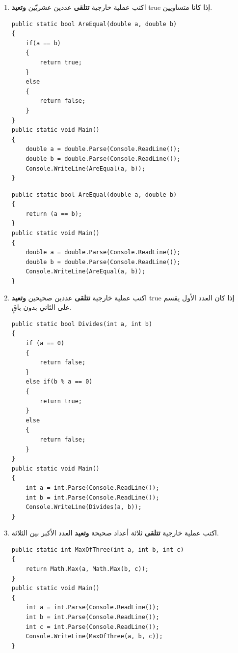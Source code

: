 ﻿\documentclass[12pt]{article}
\begin{document}
\begin{enumerate}[itemsep=3em]
\begin{enumerate}
\item اكتب عملية خارجية \textbf{تتلقى} عددين عشريّين \textbf{وتعيد} \textenglish{true} إذا كانا متساويين.
\ifwithsols
\begin{boxSolution}[1]
\begin{english}
\begin{verbatim}
public static bool AreEqual(double a, double b)
{
    if(a == b)
    {
        return true;
    }
    else
    {
        return false;
    }
}
public static void Main()
{
    double a = double.Parse(Console.ReadLine());
    double b = double.Parse(Console.ReadLine());
    Console.WriteLine(AreEqual(a, b));
}
\end{verbatim}
\end{english}
\end{boxSolution}
\begin{boxSolution}[2]
\begin{english}
\begin{verbatim}
public static bool AreEqual(double a, double b)
{
    return (a == b);
}
public static void Main()
{
    double a = double.Parse(Console.ReadLine());
    double b = double.Parse(Console.ReadLine());
    Console.WriteLine(AreEqual(a, b));
}
\end{verbatim}
\end{english}
\end{boxSolution}
\clearpage
\fi


\item اكتب عملية خارجية \textbf{تتلقى} عددين صحيحين \textbf{وتعيد} \textenglish{true} إذا كان العدد الأول يقسم على الثاني بدون باقٍ.
\ifwithsols
\begin{boxSolution}
\begin{english}
\begin{verbatim}
public static bool Divides(int a, int b)
{
    if (a == 0)
    {
        return false;
    }
    else if(b % a == 0)
    {
        return true;
    }
    else
    {
        return false;
    }
}
public static void Main()
{
    int a = int.Parse(Console.ReadLine());
    int b = int.Parse(Console.ReadLine());
    Console.WriteLine(Divides(a, b));
}
\end{verbatim}
\end{english}
\end{boxSolution}
\clearpage
\fi


\item اكتب عملية خارجية \textbf{تتلقى} ثلاثة أعداد صحيحة \textbf{وتعيد} العدد الأكبر بين الثلاثة.
\ifwithsols
\begin{boxSolution}
\begin{english}
\begin{verbatim}
public static int MaxOfThree(int a, int b, int c)
{
    return Math.Max(a, Math.Max(b, c));
}
public static void Main()
{
    int a = int.Parse(Console.ReadLine());
    int b = int.Parse(Console.ReadLine());
    int c = int.Parse(Console.ReadLine());
    Console.WriteLine(MaxOfThree(a, b, c));
}
\end{verbatim}
\end{english}
\end{boxSolution}
\fi


\end{enumerate}
\end{enumerate}
\end{document}
